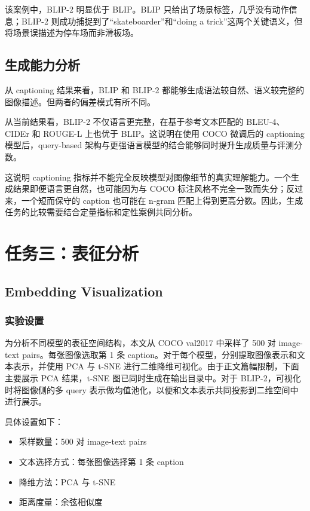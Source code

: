 \documentclass[UTF8,a4paper,10pt]{ctexart}
\begin{document}
该案例中，BLIP-2 明显优于 BLIP。BLIP 只给出了场景标签，几乎没有动作信息；BLIP-2 则成功捕捉到了“skateboarder”和“doing a trick”这两个关键语义，但将场景误描述为停车场而非滑板场。

\subsection{生成能力分析}

从 captioning 结果来看，BLIP 和 BLIP-2 都能够生成语法较自然、语义较完整的图像描述。但两者的偏差模式有所不同。

从当前结果看，BLIP-2 不仅语言更完整，在基于参考文本匹配的 BLEU-4、CIDEr 和 ROUGE-L 上也优于 BLIP。这说明在使用 COCO 微调后的 captioning 模型后，query-based 架构与更强语言模型的结合能够同时提升生成质量与评测分数。

这说明 captioning 指标并不能完全反映模型对图像细节的真实理解能力。一个生成结果即便语言更自然，也可能因为与 COCO 标注风格不完全一致而失分；反过来，一个短而保守的 caption 也可能在 n-gram 匹配上得到更高分数。因此，生成任务的比较需要结合定量指标和定性案例共同分析。

\section{任务三：表征分析}

\subsection{Embedding Visualization}

\subsubsection{实验设置}

为分析不同模型的表征空间结构，本文从 COCO val2017 中采样了 500 对 image-text pairs。每张图像选取第 1 条 caption。对于每个模型，分别提取图像表示和文本表示，并使用 PCA 与 t-SNE 进行二维降维可视化。由于正文篇幅限制，下面主要展示 PCA 结果，t-SNE 图已同时生成在输出目录中。对于 BLIP-2，可视化时将图像侧的多 query 表示做均值池化，以便和文本表示共同投影到二维空间中进行展示。

具体设置如下：

\begin{itemize}
    \item 采样数量：500 对 image-text pairs
    \item 文本选择方式：每张图像选择第 1 条 caption
    \item 降维方法：PCA 与 t-SNE
    \item 距离度量：余弦相似度
\end{itemize}
\end{document}
